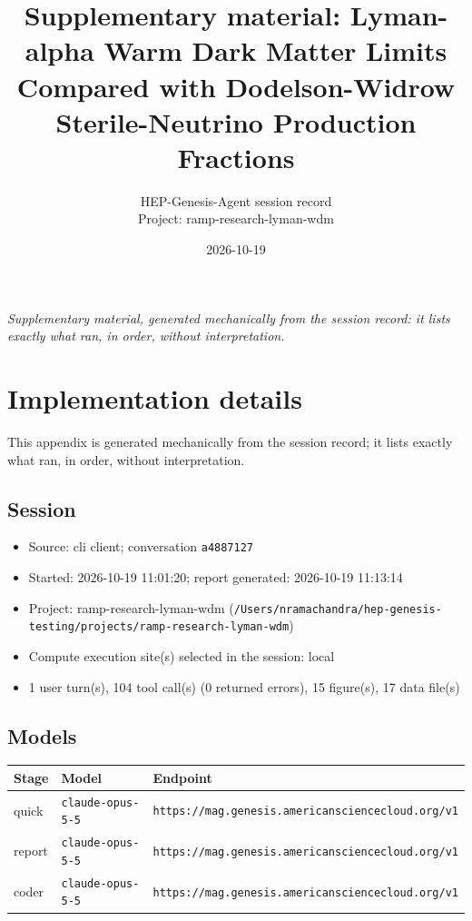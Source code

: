 \documentclass[11pt,a4paper]{article}
\title{Supplementary material: Lyman-alpha Warm Dark Matter Limits Compared with Dodelson-Widrow Sterile-Neutrino Production Fractions}
\author{HEP-Genesis-Agent session record \\ \small Project: ramp-research-lyman-wdm}
\date{2026-10-19}
\begin{document}
\maketitle
\noindent\textit{\small Supplementary material, generated mechanically from the session record: it lists exactly what ran, in order, without interpretation.}
\vspace{1em}



\appendix
\section{Implementation details}
\label{app:impl}
This appendix is generated mechanically from the session record; it lists exactly what ran, in order, without interpretation.
\subsection{Session}
\begin{itemize}
  \item Source: cli client; conversation \texttt{a4887127}
  \item Started: 2026-10-19 11:01:20; report generated: 2026-10-19 11:13:14
  \item Project: ramp-research-lyman-wdm (\texttt{/\allowbreak{}Users/\allowbreak{}nramachandra/\allowbreak{}hep-genesis-testing/\allowbreak{}projects/\allowbreak{}ramp-research-lyman-wdm})
  \item Compute execution site(s) selected in the session: local
  \item 1 user turn(s), 104 tool call(s) (0 returned errors), 15 figure(s), 17 data file(s)
\end{itemize}
\subsection{Models}
\begin{longtable}{@{}p{}p{}p{}@{}}
\toprule Stage & Model & Endpoint \\ \midrule \endhead
quick & \texttt{claude-opus-5-5} & \texttt{https:\allowbreak{}/\allowbreak{}/\allowbreak{}mag.genesis.americansciencecloud.org/\allowbreak{}v1} \\
report & \texttt{claude-opus-5-5} & \texttt{https:\allowbreak{}/\allowbreak{}/\allowbreak{}mag.genesis.americansciencecloud.org/\allowbreak{}v1} \\
coder & \texttt{claude-opus-5-5} & \texttt{https:\allowbreak{}/\allowbreak{}/\allowbreak{}mag.genesis.americansciencecloud.org/\allowbreak{}v1} \\
\bottomrule\end{longtable}
\end{document}
